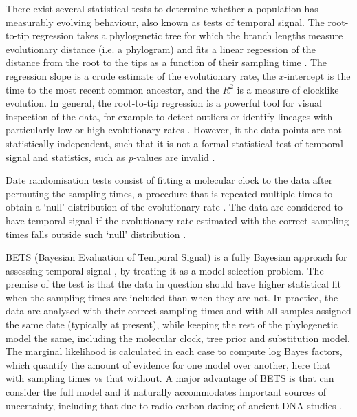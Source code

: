 \documentclass[10pt,letterpaper]{article}
\begin{document}
There exist several statistical tests to determine whether a population has measurably evolving behaviour, also known as tests of temporal signal. The root-to-tip regression takes a phylogenetic tree for which the branch lengths measure evolutionary distance (i.e. a phylogram) and fits a linear regression of the distance from the root to the tips as a function of their sampling time \cite{korber2000timing}. The regression slope is a crude estimate of the evolutionary rate, the \textit{x-}intercept is the time to the most recent common ancestor, and the $R^2$ is a measure of clocklike evolution. In general, the root-to-tip regression is a powerful tool for visual inspection of the data, for example to detect outliers or identify lineages with particularly low or high evolutionary rates \cite{rambaut2016exploring,featherstone2023clockor2,volz2017scalable}. However, it the data points are not statistically independent, such that it is not a formal statistical test of temporal signal and statistics, such as \textit{p-}values are invalid \cite{rieux2016inferences}.

Date randomisation tests consist of fitting a molecular clock to the data after permuting the sampling times, a procedure that is repeated multiple times to obtain a `null' distribution of the evolutionary rate \cite{ramsden2009hantavirus}. The data are considered to have temporal signal if the evolutionary rate estimated with the correct sampling times falls outside such `null' distribution \cite{ramsden2009hantavirus,duchene2015performance}.

BETS (Bayesian Evaluation of Temporal Signal) is a fully Bayesian approach for assessing temporal signal \cite{duchene2020bayesian}, by treating it as a model selection problem. The premise of the test is that the data in question should have higher statistical fit when the sampling times are included than when they are not. In practice, the data are analysed with their correct sampling times and with all samples assigned the same date (typically at present), while keeping the rest of the phylogenetic model the same, including the molecular clock, tree prior and substitution model. The marginal likelihood is calculated in each case to compute log Bayes factors, which quantify the amount of evidence for one model over another, here that with sampling times vs that without. A major advantage of BETS is that can consider the full model and it naturally accommodates important sources of uncertainty, including that due to radio carbon dating of ancient DNA studies \cite{molak2015empirical}. 
\end{document}
